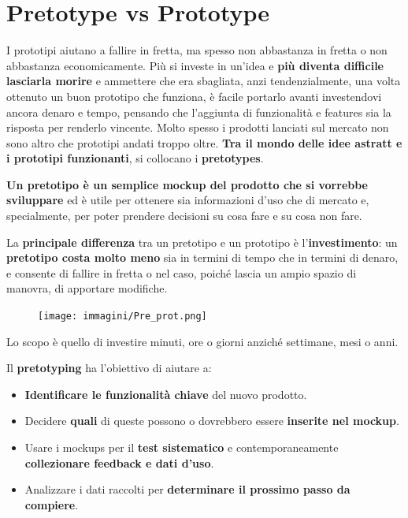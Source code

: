 \section{Pretotype vs Prototype}
I prototipi aiutano a fallire in fretta, ma spesso non abbastanza in fretta o non abbastanza economicamente.
Più si investe in un'idea e \textbf{più diventa difficile lasciarla morire} e ammettere che era sbagliata, anzi tendenzialmente, una volta ottenuto un buon
prototipo che funziona, è facile portarlo avanti investendovi ancora denaro e tempo, pensando che l'aggiunta di funzionalità e features sia la risposta per
renderlo vincente. Molto spesso i prodotti lanciati sul mercato non sono altro che prototipi andati troppo oltre. \textbf{Tra il mondo delle idee astratt
 e i prototipi funzionanti}, si collocano i \textbf{pretotypes}.

\textbf{Un pretotipo è un semplice mockup del prodotto che si vorrebbe sviluppare} ed è utile per ottenere sia informazioni d'uso che di mercato e,
specialmente, per poter prendere decisioni su cosa fare e su cosa non fare.

La \textbf{principale differenza} tra un pretotipo e un prototipo è l'\textbf{investimento}: un \textbf{pretotipo costa molto meno} sia in termini di tempo 
che in termini di denaro, e consente di fallire in fretta o nel caso, poiché lascia un ampio spazio di manovra, di apportare modifiche.

\begin{figure}[!h]
	\centering
	\texttt{[image: immagini/Pre\_prot.png]}
\end{figure}

Lo scopo è quello di investire minuti, ore o giorni anziché settimane, mesi o anni.

Il \textbf{pretotyping} ha l'obiettivo di aiutare a:

\begin{itemize}
	\itemsep-0.3em
	\item \textbf{Identificare le funzionalità chiave} del nuovo prodotto.
	\item Decidere \textbf{quali} di queste possono o dovrebbero essere \textbf{inserite nel mockup}.
	\item Usare i mockups per il \textbf{test sistematico} e contemporaneamente \textbf{collezionare feedback e dati d'uso}.
	\item Analizzare i dati raccolti per \textbf{determinare il prossimo passo da compiere}.
\end{itemize}

